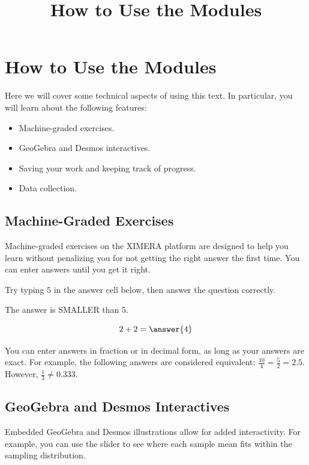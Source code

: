 \documentclass{ximera}
\title{How to Use the Modules} \license{CC BY-NC-SA 4.0}
\begin{document}
\begin{abstract}
\end{abstract}
\maketitle



\section*{How to Use the Modules}
Here we will cover some technical aspects of using this text.  In particular, you will learn about the following features:
\begin{itemize}
    \item Machine-graded exercises.
    \item GeoGebra and Desmos interactives.
    \item Saving your work and keeping track of progress.
    \item Data collection.
\end{itemize}

\subsection*{Machine-Graded Exercises}
Machine-graded exercises on the XIMERA platform are designed to help you learn without penalizing you for not getting the right answer the first time.  You can enter answers until you get it right.  
\begin{question}
Try typing $5$ in the answer cell below, then answer the question correctly.
\begin{hint} %
    The answer is SMALLER than 5.
\end{hint}
$$2+2=\answer{4}$$
\end{question}
You can enter answers in fraction or in decimal form, as long as your answers are exact.  For example, the following answers are considered equivalent: $\frac{10}{4}=\frac{5}{2}=2.5$.  However, $\frac{1}{3}\neq 0.333$.

\subsection*{GeoGebra and Desmos Interactives}
Embedded GeoGebra and Desmos illustrations allow for added interactivity.
For example, you can use the slider to see where each sample mean fits within the sampling distribution.
\end{document}
